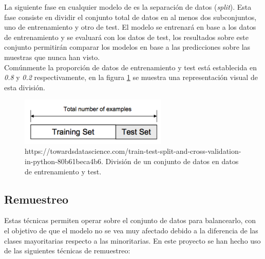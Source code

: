 \begin{enumerate}
                    La siguiente fase en cualquier modelo de  es la separación de datos (\textit{split}). Esta fase consiste en dividir el conjunto total de datos en al menos dos subconjuntos, uno de entrenamiento y otro de test. El modelo se entrenará en base a los datos de entrenamiento y se evaluará con los datos de test, los resultados sobre este conjunto permitirán comparar los modelos en base a las predicciones sobre las muestras que nunca han visto.\\


                    Comúnmente la proporción de datos de entrenamiento y test está establecida en \textit{0.8} y \textit{0.2} respectivamente, en la figura \ref{DataSplitImage} se muestra una representación visual de esta división.


                    \begin{figure}[h]
                        \centering
                        \includegraphics[width=7cm]{archivos/4.Metodologia/Datos/Separacion/DataSplit}
                        \caption{https://towardsdatascience.com/train-test-split-and-cross-validation-in-python-80b61beca4b6. División de un conjunto de datos en datos de entrenamiento y test.}
                        \label{DataSplitImage}
                     \end{figure}

            \end{enumerate}



        \subsection{Remuestreo}


            Estas técnicas permiten operar sobre el conjunto de datos para balancearlo, con el objetivo de que el modelo no se vea muy afectado debido a la diferencia de las clases mayoritarias respecto a las minoritarias. En este proyecto se han hecho uso de las siguientes técnicas de remuestreo:

